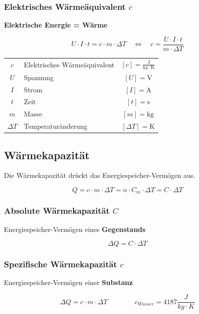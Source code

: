 \subsubsection{Elektrisches Wärmeäquivalent $c$}
\textbf{Elektrische Energie = Wärme}

$$ U \cdot I \cdot t = c \cdot m \cdot \Delta T \quad \Leftrightarrow \quad c = \frac{U \cdot I \cdot t}{m \cdot \Delta T}$$

\begin{tabular}{c l c}
	\rule{0pt}{8pt}$c$ & Elektrisches Wärmeäquivalent & $[c] = \mathrm{\frac{J}{kg \cdot K}}$ \\
	$U$ & Spannung & $[U] = \mathrm{V}$ \\
	$I$ & Strom & $[I] = \mathrm{A}$ \\
	$t$ & Zeit & $[t] = \mathrm{s}$ \\
	$m$ & Masse & $[m] = \mathrm{kg}$ \\
	$\Delta T$ & Temperaturänderung & $[\Delta T] = \mathrm{K}$ \\
\end{tabular}





\vfill\null
\columnbreak



\subsection{Wärmekapazität}
Die Wärmekapazität drückt das Energiespeicher-Vermögen aus.

$$ \boxed{ Q = c \cdot m \cdot \Delta T = n \cdot C_m \cdot \Delta T = C \cdot \Delta T  }$$


\subsubsection{Absolute Wärmekapazität $C$}
Energiespeicher-Vermögen eines \textbf{Gegenstands}

$$ \boxed{ \Delta Q = C \cdot \Delta T } $$


\subsubsection{Spezifische Wärmekapazität $c$}
Energiespeicher-Vermögen einer \textbf{Substanz}

$$ \boxed{ \Delta Q = c \cdot m \cdot \Delta T  } \qquad \qquad c_{Wasser} = 4187 \frac{J}{kg \cdot K}  $$


